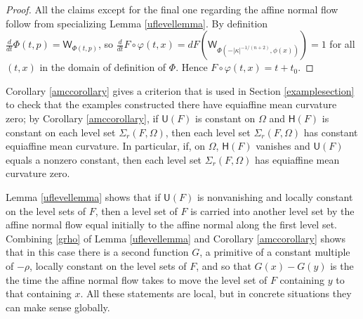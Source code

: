 \documentclass [leqno, 10pt]{amsart}
\theoremstyle{definition}
\numberwithin{equation}{section}
\newcommand{\Om}{\Omega}
\newcommand{\U}{\mathsf{U}}
\newcommand{\lc}{\Sigma}
\renewcommand{\H}{\mathsf{H}}
\newcommand{\ka}{\kappa}
\newcommand{\nm}{\mathsf{W}}
\begin{document}
\begin{proof}
All the claims except for the final one regarding the affine normal flow follow from specializing Lemma \ref{uflevellemma}. By definition  $\tfrac{d}{dt}\Phi(t, p) = \nm_{\Phi(t, p)}$, so $\tfrac{d}{dt}F\circ \varphi(t, x) = dF(\nm_{\Phi(-|\ka|^{-1/(n+2)}, \phi(x))}) = 1$ for all $(t, x)$ in the domain of definition of $\Phi$. Hence $F\circ \varphi(t, x) = t + t_{0}$.
\end{proof}

Corollary \ref{amccorollary} gives a criterion that is used in Section \ref{examplesection} to check that the examples constructed there have equiaffine mean curvature zero; by Corollary \ref{amccorollary}, if $\U(F)$ is constant on $\Om$ and $\H(F)$ is constant on each level set $\lc_{r}(F, \Om)$, then each level set $\lc_{r}(F, \Om)$ has constant equiaffine mean curvature. In particular, if, on $\Om$, $\H(F)$ vanishes and $\U(F)$ equals a nonzero constant, then each level set $\lc_{r}(F, \Om)$ has equiaffine mean curvature zero.

Lemma \ref{uflevellemma} shows that if $\U(F)$ is nonvanishing and locally constant on the level sets of $F$, then a level set of $F$ is carried into another level set by the affine normal flow equal initially to the affine normal along the first level set. Combining \eqref{grho} of Lemma \ref{uflevellemma} and Corollary \ref{amccorollary} shows that in this case there is a second function $G$, a primitive of a constant multiple of $-\rho$, locally constant on the level sets of $F$, and so that $G(x) - G(y)$ is the the time the affine normal flow takes to move the level set of $F$ containing $y$ to that containing $x$. All these statements are local, but in concrete situations they can make sense globally.
\end{document}
